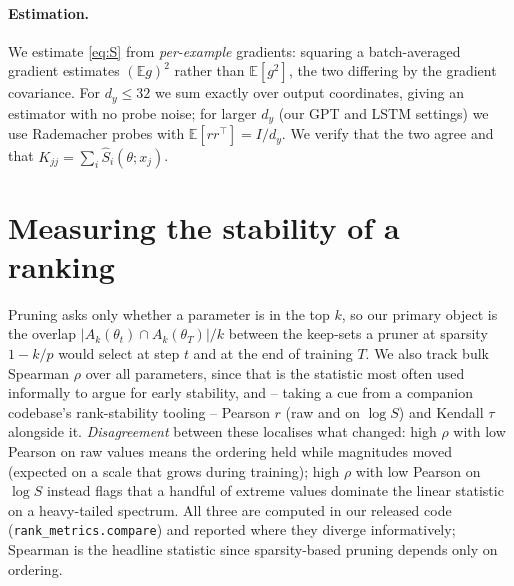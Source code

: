 \documentclass{article}
\begin{document}
\paragraph{Estimation.}
We estimate \eqref{eq:S} from \emph{per-example} gradients: squaring a batch-averaged
gradient estimates $(\mathbb E g)^2$ rather than $\mathbb E[g^2]$, the two differing by the
gradient covariance. For $d_y\le 32$ we sum exactly over output coordinates, giving an
estimator with no probe noise; for larger $d_y$ (our GPT and LSTM settings) we use
Rademacher probes with $\mathbb E[rr^\top]=I/d_y$. We verify that the two agree and that
$K_{jj}=\sum_i\widehat S_i(\theta;x_j)$.

\section{Measuring the stability of a ranking}
\label{sec:protocol}

Pruning asks only whether a parameter is in the top $k$, so our primary object is the
overlap $|A_k(\theta_t)\cap A_k(\theta_T)|/k$ between the keep-sets a pruner at sparsity
$1-k/p$ would select at step $t$ and at the end of training $T$. We also track bulk
Spearman $\rho$ over all parameters, since that is the statistic most often used
informally to argue for early stability, and -- taking a cue from a companion codebase's
rank-stability tooling -- Pearson $r$ (raw and on $\log S$) and Kendall $\tau$ alongside it.
\emph{Disagreement} between these localises what changed: high $\rho$ with low Pearson on
raw values means the ordering held while magnitudes moved (expected on a scale that grows
during training); high $\rho$ with low Pearson on $\log S$ instead flags that a handful of
extreme values dominate the linear statistic on a heavy-tailed spectrum. All three are
computed in our released code (\texttt{rank\_metrics.compare}) and reported where they
diverge informatively; Spearman is the headline statistic since sparsity-based pruning
depends only on ordering.
\end{document}
